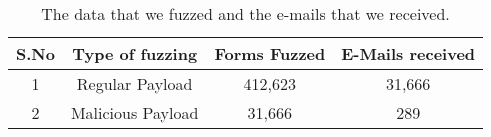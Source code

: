 \begin{table}[!htbp]
	\centering
	\begin{tabular}{|c|c|c|c|}
		\hline
		\multicolumn{1}{|c|}{\textbf{S.No}} &
		\multicolumn{1}{c|}{\textbf{Type of fuzzing}} &
		\multicolumn{1}{c|}{\textbf{Forms Fuzzed}} &
		\multicolumn{1}{c|}{\textbf{E-Mails received}}\\
		\hline
		1 & Regular Payload & 412,623 & 31,666 \\
		\hline
		2 & Malicious Payload & 31,666 & 289 \\
		\hline
	\end{tabular}
	\caption[Fuzzed data]{The data that we fuzzed and the e-mails that we received.}
	\label{tab:fuzzed_data}
\end{table}